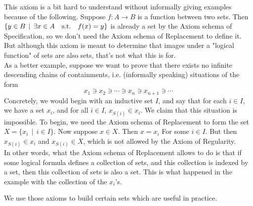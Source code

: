 \begin{remark}
    This axiom is a bit hard to understand without informally giving examples because of the following. Suppose $f : A \to B$ is a function between two sets. Then $\{ y \in B \, \mid \, \exists x \in A \quad \text{s.t.} \quad f(x) = y \}$ is already a set by the Axiom schema of Specification, so we don't need the Axiom schema of Replacement to define it. But although this axiom is meant to determine that images under a "logical function" of sets are also sets, that's not what this is for. 
    \\

    As a better example, suppose we want to prove that there exists no infinite descending chains of containments, i.e. (informally speaking) situations of the form
    \[
        x_1 \ni x_2 \ni \cdots \ni x_n \ni x_{n+1} \ni \cdots    
    \]
    Concretely, we would begin with an inductive set $I$, and say that for each $i \in I$, we have a set $x_i$, and for all $i \in I$, $x_{S(i)} \in x_i$. We claim that this situation is impossible. To begin, we need the Axiom schema of Replacement to form the set $X = \{ x_i \, \mid \, i \in I \}$. Now suppose $x \in X$. Then $x = x_i$ For some $i \in I$. But then $x_{S(i)} \in x_i$ and $x_{S(i)} \in X$, which is not allowed by the Axiom of Regularity. 
    \\

    In other words, what the Axiom schema of Replacement allows to do is that if some logical formula defines a collection of sets, and this collection is indexed by a set, then this collection of sets is also a set. This is what happened in the example with the collection of the $x_i$'s. 
    \\
\end{remark}

We use those axioms to build certain sets which are useful in practice. 
\\

